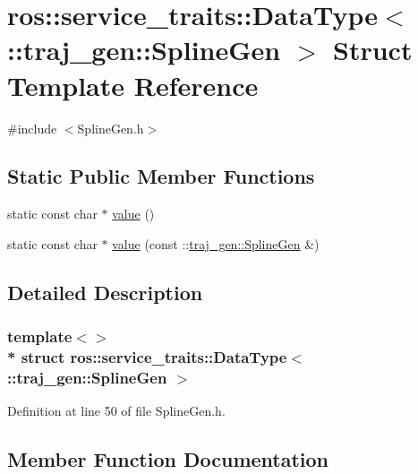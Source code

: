 \hypertarget{structros_1_1service__traits_1_1_data_type_3_01_1_1traj__gen_1_1_spline_gen_01_4}{}\section{ros\+:\+:service\+\_\+traits\+:\+:Data\+Type$<$ \+:\+:traj\+\_\+gen\+:\+:Spline\+Gen $>$ Struct Template Reference}
\label{structros_1_1service__traits_1_1_data_type_3_01_1_1traj__gen_1_1_spline_gen_01_4}


{\ttfamily \#include $<$Spline\+Gen.\+h$>$}

\subsection*{Static Public Member Functions}
\begin{DoxyCompactItemize}
\item 
static const char $\ast$ \hyperlink{structros_1_1service__traits_1_1_data_type_3_01_1_1traj__gen_1_1_spline_gen_01_4_aa360a20278d15909d7e95f8d4c7b2f00}{value} ()
\item 
static const char $\ast$ \hyperlink{structros_1_1service__traits_1_1_data_type_3_01_1_1traj__gen_1_1_spline_gen_01_4_aa91f4492b3cdee93fc56964c34c38101}{value} (const \+::\hyperlink{structtraj__gen_1_1_spline_gen}{traj\+\_\+gen\+::\+Spline\+Gen} \&)
\end{DoxyCompactItemize}


\subsection{Detailed Description}
\subsubsection*{template$<$$>$\\*
struct ros\+::service\+\_\+traits\+::\+Data\+Type$<$ \+::traj\+\_\+gen\+::\+Spline\+Gen $>$}



Definition at line 50 of file Spline\+Gen.\+h.



\subsection{Member Function Documentation}
